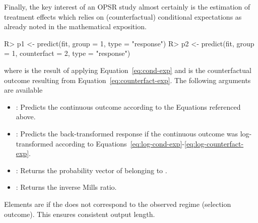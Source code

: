 \documentclass[%
    twoside, openright, titlepage, numbers=noenddot,%
    cleardoublepage=empty,%
    abstract=false,%
    BCOR=5.5mm, paper=a5, fontsize=10pt,%
]{scrreprt}
\begin{document}
%
Finally, the key interest of an OPSR study almost certainly is the estimation of treatment effects which relies on (counterfactual) conditional expectations as already noted in the mathematical exposition.
%
\begin{Schunk}
\begin{Sinput}
R> p1 <- predict(fit, group = 1, type = "response")
R> p2 <- predict(fit, group = 1, counterfact = 2, type = "response")
\end{Sinput}
\end{Schunk}
%
where  is the result of applying Equation~\ref{eq:cond-exp} and  is the counterfactual outcome resulting from Equation~\ref{eq:counterfact-exp}. The following  arguments are available
\begin{itemize}
\item {}: Predicts the continuous outcome according to the Equations referenced above.
\item {}: Predicts the back-transformed response if the continuous outcome was log-transformed according to Equations~\ref{eq:log-cond-exp}-\ref{eq:log-counterfact-exp}.
\item {}: Returns the probability vector of belonging to .
\item {}: Returns the inverse Mills ratio.
\end{itemize}
Elements are  if the  does not correspond to the observed regime (selection outcome). This ensures consistent output length.
\end{document}

